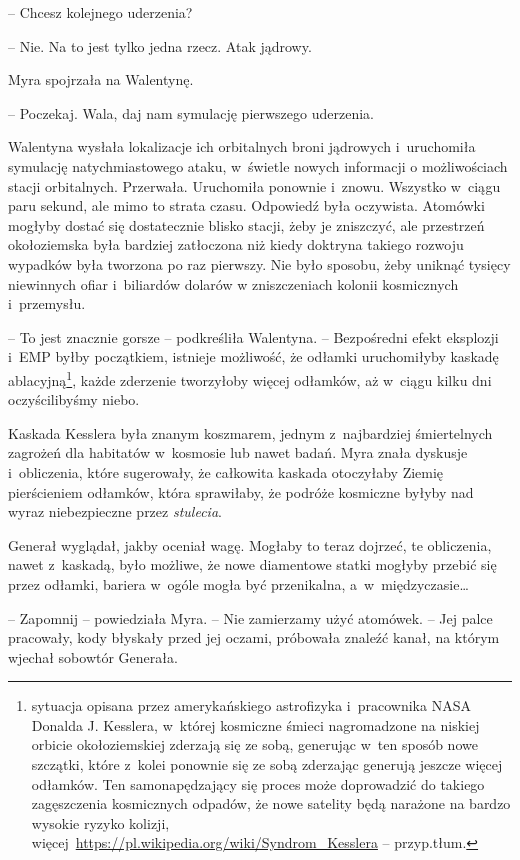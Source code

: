\documentclass[oneside,polish,11pt,sfheadings]{mwbk}
\begin{document}
-- Chcesz kolejnego uderzenia?

-- Nie. Na to jest tylko jedna rzecz. Atak jądrowy.

Myra spojrzała na Walentynę. 

-- Poczekaj. Wala, daj nam symulację
pierwszego uderzenia.

Walentyna wysłała lokalizacje ich orbitalnych broni jądrowych i~uruchomiła symulację natychmiastowego ataku, w~świetle nowych informacji
o możliwościach stacji orbitalnych. Przerwała. Uruchomiła ponownie i~znowu. Wszystko w~ciągu paru sekund, ale mimo to strata czasu. Odpowiedź
była oczywista. Atomówki mogłyby dostać się dostatecznie blisko stacji,
żeby je zniszczyć, ale przestrzeń okołoziemska była bardziej zatłoczona
niż kiedy doktryna takiego rozwoju wypadków była tworzona po raz pierwszy. Nie
było sposobu, żeby uniknąć tysięcy niewinnych ofiar i~biliardów dolarów
w zniszczeniach kolonii kosmicznych i~przemysłu.

-- To jest znacznie gorsze -- podkreśliła Walentyna. -- Bezpośredni efekt
eksplozji i~EMP byłby początkiem, istnieje możliwość, że odłamki
uruchomiłyby kaskadę ablacyjną\footnote{ sytuacja opisana przez amerykańskiego
astrofizyka i~pracownika NASA Donalda J. Kesslera, w~której kosmiczne
śmieci nagromadzone na niskiej orbicie okołoziemskiej zderzają się ze
sobą, generując w~ten sposób nowe szczątki, które z~kolei ponownie się
ze sobą zderzając generują jeszcze więcej odłamków. Ten samonapędzający
się proces może doprowadzić do takiego zagęszczenia kosmicznych odpadów,
że nowe satelity będą narażone na bardzo wysokie ryzyko kolizji,
więcej~\url{https://pl.wikipedia.org/wiki/Syndrom\_Kesslera} -- przyp.tłum.}, każde zderzenie tworzyłoby więcej odłamków, aż w~ciągu
kilku dni oczyścilibyśmy niebo.

Kaskada Kesslera była znanym koszmarem, jednym z~najbardziej
śmiertelnych zagrożeń dla habitatów w~kosmosie lub nawet badań. Myra
znała dyskusje i~obliczenia, które sugerowały, że całkowita kaskada
otoczyłaby Ziemię pierścieniem odłamków, która sprawiłaby, że podróże
kosmiczne byłyby nad wyraz niebezpieczne przez \textit{stulecia}.

Generał wyglądał, jakby oceniał wagę. Mogłaby to teraz dojrzeć, te
obliczenia, nawet z~kaskadą, było możliwe, że nowe diamentowe statki
mogłyby przebić się przez odłamki, bariera w~ogóle mogła być
przenikalna, a~w~międzyczasie\ldots

-- Zapomnij -- powiedziała Myra. -- Nie zamierzamy użyć atomówek. -- Jej
palce pracowały, kody błyskały przed jej oczami, próbowała znaleźć
kanał, na którym wjechał sobowtór Generała.
\end{document}
